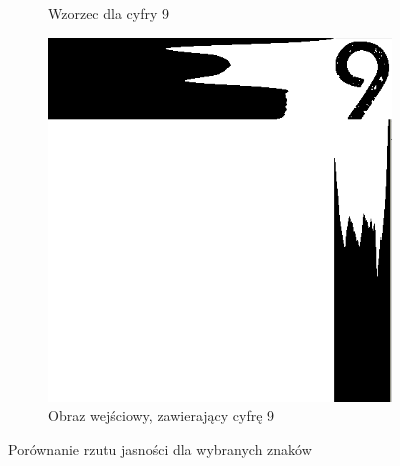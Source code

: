 \begin{figure}
\begin{subfigure}[b]{0.42\textwidth}
    \caption{Wzorzec dla cyfry 9}
    \label{fig:rzut_wzorzec_9}
  \end{subfigure}
  \begin{subfigure}[b]{0.44\textwidth}
    \includegraphics[width=\textwidth]{img/rzut-in-9}
    \caption{Obraz wejściowy, zawierający cyfrę 9}
    \label{fig:rzut_in_9}
  \end{subfigure}
  \caption{Porównanie rzutu jasności dla wybranych znaków}
    \label{fig:rzut_jasnosci_ocr}
\end{figure}


